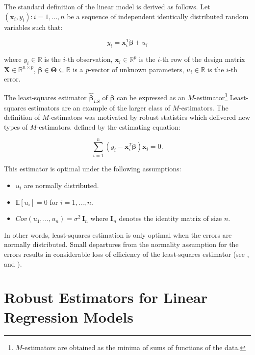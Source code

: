 \documentclass[]{book}
\providecommand{\tightlist}{%
  \setlength{\itemsep}{0pt}\setlength{\parskip}{0pt}}
\let\rmarkdownfootnote\footnote%
\def\footnote{\protect\rmarkdownfootnote}
\theoremstyle{definition}
\theoremstyle{definition}
\theoremstyle{definition}
\theoremstyle{remark}
\begin{document}
The standard definition of the linear model is derived as follows. Let
\({(\mathbf{x}_{i},y_{i}): i = 1, \ldots, n}\) be a sequence of
independent identically distributed random variables such that:

\[y_{i} = \mathbf{x}_{i}^{T} {\boldsymbol{\beta}} + u_{i}\]

where \(y_{i} \in \mathbb{R}\) is the \(i\)-th observation,
\(\mathbf{x}_{i} \in \mathbb{R}^{p}\) is the \(i\)-th row of the design
matrix \(\mathbf{X} \in \mathbb{R}^{n\times p}\),
\(\boldsymbol{\beta} \in \boldsymbol{\Theta} \subseteq \mathbb{R}\) is a
\emph{p}-vector of unknown parameters, \(u_{i} \in \mathbb{R}\) is the
\(i\)-th error.

The least-squares estimator \(\hat{\boldsymbol{\beta}}_{LS}\) of
\(\boldsymbol{\beta}\) can be expressed as an \(M\)-estimator\footnote{\(M\)-estimators
  are obtained as the minima of sums of functions of the data.}
Least-squares estimators are an example of the larger class of
\(M\)-estimators. The definition of \(M\)-estimators was motivated by
robust statistics which delivered new types of \(M\)-estimators. defined
by the estimating equation:

\begin{equation}
  \sum_{i = 1}^{n} \left(y_{i} - \mathbf{x}_{i}^{T} \boldsymbol{\beta} \right)\mathbf{x}_{i} = 0.
    \label{eq:lsMestim2}
\end{equation}

This estimator is optimal under the following assumptions:

\begin{itemize}
\tightlist
\item
  \(u_{i}\) are normally distributed.
\item
  \(\mathbb{E}[u_{i}] = 0\) for \(i = 1, \ldots, n\).
\item
  \(Cov(u_{1}, \ldots, u_{n}) = \sigma^2 \, \mathbf{I}_{n}\) where
  \(\mathbf{I}_{n}\) denotes the identity matrix of size \(n\).
\end{itemize}

In other words, least-squares estimation is only optimal when the errors
are normally distributed. Small departures from the normality assumption
for the errors results in considerable loss of efficiency of the
least-squares estimator (see \citet{hampel1987robust},
\citet{huber1973robust} and \citet{hampel1973robust}).

\section{Robust Estimators for Linear Regression
Models}\label{robust-estimators-for-linear-regression-models}
\end{document}
